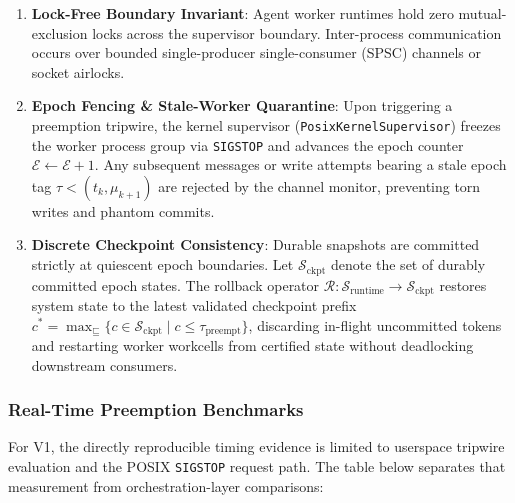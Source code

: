 \documentclass[
  10pt,letterpaper]{article}
\providecommand{\tightlist}{%
  \setlength{\itemsep}{0pt}\setlength{\parskip}{0pt}}
\begin{document}
\begin{enumerate}
\def\labelenumi{\arabic{enumi}.}
\tightlist
\item
  \textbf{Lock-Free Boundary Invariant}: Agent worker runtimes hold zero
  mutual-exclusion locks across the supervisor boundary. Inter-process
  communication occurs over bounded single-producer single-consumer
  (SPSC) channels or socket airlocks.
\item
  \textbf{Epoch Fencing \& Stale-Worker Quarantine}: Upon triggering a
  preemption tripwire, the kernel supervisor
  (\texttt{PosixKernelSupervisor}) freezes the worker process group via
  \texttt{SIGSTOP} and advances the epoch counter
  \(\mathcal{E} \leftarrow \mathcal{E} + 1\). Any subsequent messages or
  write attempts bearing a stale epoch tag \(\tau < (t_k, \mu_{k+1})\)
  are rejected by the channel monitor, preventing torn writes and
  phantom commits.
\item
  \textbf{Discrete Checkpoint Consistency}: Durable snapshots are
  committed strictly at quiescent epoch boundaries. Let
  \(\mathcal{S}_{\text{ckpt}}\) denote the set of durably committed
  epoch states. The rollback operator
  \(\mathcal{R}: \mathcal{S}_{\text{runtime}} \to \mathcal{S}_{\text{ckpt}}\)
  restores system state to the latest validated checkpoint prefix
  \(c^* = \max_{\sqsubseteq} \{ c \in \mathcal{S}_{\text{ckpt}} \mid c \le \tau_{\text{preempt}} \}\),
  discarding in-flight uncommitted tokens and restarting worker
  workcells from certified state without deadlocking downstream
  consumers.
\end{enumerate}

\subsubsection{Real-Time Preemption
Benchmarks}\label{real-time-preemption-benchmarks}

For V1, the directly reproducible timing evidence is limited to userspace
tripwire evaluation and the POSIX \texttt{SIGSTOP} request path. The table
below separates that measurement from orchestration-layer comparisons:
\end{document}
